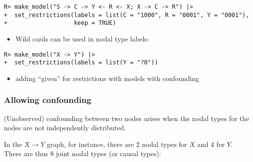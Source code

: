 \documentclass[
  11pt,
  article]{jss}
\providecommand{\tightlist}{%
  \setlength{\itemsep}{0pt}\setlength{\parskip}{0pt}}\usepackage{longtable,booktabs,array}
\begin{document}
\begin{verbatim}
R> make_model("S -> C -> Y <- R <- X; X -> C -> R") |>
+  set_restrictions(labels = list(C = "1000", R = "0001", Y = "0001"), 
+                   keep = TRUE)
\end{verbatim}

\begin{itemize}
\tightlist
\item
  Wild cards can be used in nodal type labels:
\end{itemize}

\begin{verbatim}
R> make_model("X -> Y") |>
+  set_restrictions(labels = list(Y = "?0"))
\end{verbatim}

\begin{itemize}
\tightlist
\item
  adding ``given'' for restrictions with models with confounding
\end{itemize}

\hypertarget{confounding}{%
\subsubsection{Allowing confounding}\label{confounding}}

(Unobserved) confounding between two nodes arises when the nodal types
for the nodes are not independently distributed.

In the \(X \rightarrow Y\) graph, for instance, there are 2 nodal types
for \(X\) and 4 for \(Y\). There are thus 8 joint nodal types (or causal
types):
\end{document}

